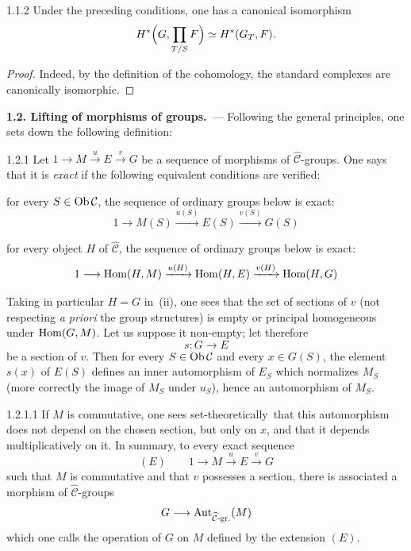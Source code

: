 \begin{lemma}{1.1.2}\label{III.1.1.2}
Under the preceding conditions, one has a canonical isomorphism
\[
H^{*}\Bigl(G, \prod_{T/S}F\Bigr)\simeq H^{*}(G_{T}, F).
\]
\end{lemma}

\begin{proof}
Indeed, by the definition of the cohomology, the standard complexes are
canonically isomorphic.
\end{proof}

\par{}%
\noindent\textbf{1.2. Lifting of morphisms of groups.}\ ---%
\label{III.ssec.1.2}
{\renewcommand{\thefootnote}{(39)}}
Following the general principles, one sets down the following definition:

\begin{definition}{1.2.1}\label{III.1.2.1}
Let \(1\longrightarrow M\xrightarrow{u}E\xrightarrow{v}G\) be a sequence of
morphisms of \(\widehat{\mathcal{C}}\)-groups. One says that it is
\emph{exact} if the following equivalent conditions are verified:
\begin{enumeratei}
\item for every \(S\in\operatorname{Ob}\mathcal{C}\), the sequence of ordinary groups
below is exact:
\[
1\longrightarrow M(S)\xrightarrow{u(S)}E(S)\xrightarrow{v(S)}G(S)
\]
\item for every object \(H\) of \(\widehat{\mathcal{C}}\), the sequence of
ordinary groups below is exact:
\[
1\longrightarrow
  \operatorname{Hom}(H, M)\xrightarrow{u(H)}\operatorname{Hom}(H, E)\xrightarrow{v(H)}\operatorname{Hom}(H, G)
\]
\end{enumeratei}
\end{definition}

Taking in particular \(H=G\) in~(ii), one sees that the set of sections of
\(v\) (not respecting \emph{a priori} the group structures) is empty or
principal homogeneous under \(\operatorname{Hom}(G, M)\). Let us suppose it non-empty; let
therefore
\[
s\colon G\longrightarrow E
\]
be a section of \(v\). Then for every \(S\in\operatorname{Ob}\mathcal{C}\) and every
\(x\in G(S)\), the element \(s(x)\) of \(E(S)\) defines an inner automorphism
of \(E_{S}\) which normalizes \(M_{S}\) (more correctly the image of
\(M_{S}\) under \(u_{S}\)), hence an automorphism of \(M_{S}\).

\begin{scholium}{1.2.1.1}\label{III.1.2.1.1}
{\renewcommand{\thefootnote}{(40)}}%
If \(M\) is commutative, one sees \og set-theoretically\fg\ that this
automorphism does not depend on the chosen section, but only on \(x\), and
that it depends multiplicatively on it. In summary, to every exact sequence
\[
(E)\qquad
1\longrightarrow M\xrightarrow{u}E\xrightarrow{v}G
\]
such that \(M\) is commutative and that \(v\) possesses a section, there is
associated a morphism of \(\widehat{\mathcal{C}}\)-groups
\[
G\longrightarrow\operatorname{Aut}_{\widehat{\mathcal{C}}\text{-gr.}}(M)
\]
which one calls the operation of \(G\) on \(M\) defined by the extension
\((E)\).
\end{scholium}

